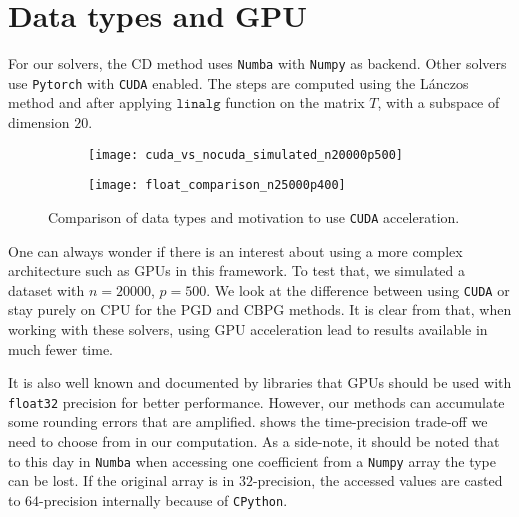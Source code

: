 \documentclass[../main.tex]{subfiles}
\begin{document}
\section{Data types and GPU}
%
For our solvers, the CD method uses \texttt{Numba} with \texttt{Numpy}
as backend. Other solvers use \texttt{Pytorch} with \texttt{CUDA} enabled.
The steps are computed using the L\'{a}nczos method and after applying
$\texttt{linalg}$ function on the matrix $T$, with a subspace of dimension $20$.
\begin{figure}[!h]
	\centering
	\begin{subfigure}{.47\textwidth}
		\centering
		\texttt{[image: cuda\_vs\_nocuda\_simulated\_n20000p500]}
		\label{fig:cuda_nocuda}
	\end{subfigure} \hfill
	\begin{subfigure}{.47\textwidth}
		\centering
		\texttt{[image: float\_comparison\_n25000p400]}
		\label{fig:float}
	\end{subfigure}
	\caption{Comparison of data types and motivation to use
	\texttt{CUDA} acceleration.}
	\label{fig:floating_point}
\end{figure}

One can always wonder if there is an interest about using a more complex
architecture such as GPUs in this framework.
To test that, we simulated a dataset with $n=20000$, $p=500$.
We look at the difference between using \texttt{CUDA} or
stay purely on CPU for the PGD and CBPG methods.
It is clear from  that, when working with these solvers,
using GPU acceleration lead to results available in much fewer time.

\medskip

It is also well known and documented by libraries \citep{torch} that GPUs
should be used with \texttt{float32} precision for better performance.
However, our methods can accumulate some rounding errors that are amplified.
 shows the time-precision trade-off we need to choose from in
our computation.
As a side-note, it should be noted that to this day in \texttt{Numba} when
accessing one coefficient from a \texttt{Numpy} array the type can be lost.
If the original array is in $32$-precision, the accessed values are casted
to $64$-precision internally because of \texttt{CPython}.
\end{document}
